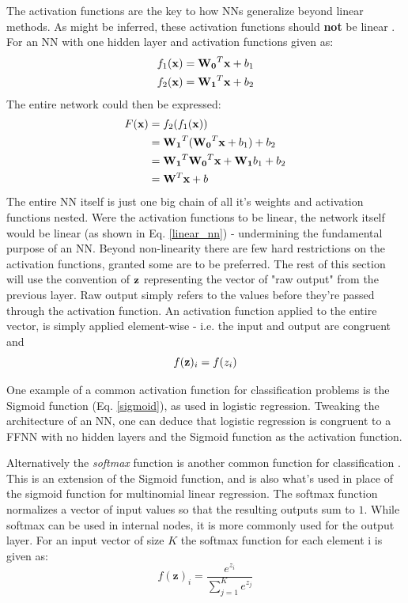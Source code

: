 The activation functions are the key to how NNs generalize beyond linear methods. As might be inferred, these activation functions should \textbf{not} be linear \citep[p.168]{Goodfellow-et-al-2016}. 
For an NN with one hidden layer and activation functions given as:
\begin{align}
\begin{split}
    f_1(\bold{x})&=\bold{W_0}^T\bold{x} + b_1 \\
    f_2(\bold{x})&=\bold{W_1}^T\bold{x} + b_2 
\end{split}
\end{align}
The entire network could then be expressed: 
\begin{align}\label{linear_nn}
    \begin{split}
        F(\bold{x})&=f_2(f_1(\bold{x})) \\
        &= \bold{W_1}^T(\bold{W_0}^T\bold{x} + b_1) + b_2 \\
        &= \bold{W_1}^T\bold{W_0}^T\bold{x}+\bold{W_1}b_1+b_2 \\
        &=\bold{W}^T\bold{x}+b
    \end{split}
\end{align}
The entire NN itself is just one big chain of all it's weights and activation functions nested. Were the activation functions to be linear, the network itself would be linear (as shown in Eq. \ref{linear_nn}) - undermining the fundamental purpose of an NN. 
Beyond non-linearity there are few hard restrictions on the activation functions, granted some are to be preferred.
The rest of this section will use the convention of $\bold{z}$ representing the vector of "raw output" from the previous layer. Raw output simply refers to the values before they're passed through the activation function. An activation function applied to the entire vector, is simply applied element-wise - i.e. the input and output are congruent and
\begin{equation}
    f(\bold{z})_i = f(z_i)
\end{equation}

One example of a common activation function for classification problems is the Sigmoid function (Eq. \ref{sigmoid}), as used in logistic regression. Tweaking the architecture of an NN, one can deduce that logistic regression is congruent to a FFNN with no hidden layers and the Sigmoid function as the activation function. 

Alternatively the \textit{softmax} function is another common function for classification \citep[Logistic Regression]{morten}. 
This is an extension of the Sigmoid function, and is also what's used in place of the sigmoid function for multinomial linear regression.
The softmax function normalizes a vector of input values so that the resulting outputs sum to $1$. While softmax can be used in internal nodes, it is more commonly used for the output layer. For an input vector of size $K$ the softmax function for each element i is given as: 
\begin{equation}\label{softmax}
f(\mathbf{z})_i = \frac{e^{z_i}}{\sum_{j=1}^K e^{z_j}}
\end{equation}


